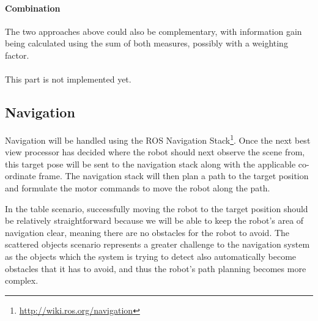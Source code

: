 \documentclass[a4paper,11pt,english]{article}
\begin{document}
\paragraph{Combination}
The two approaches above could also be complementary, with information gain being calculated using the sum of both measures, possibly with a weighting factor.


\paragraph{}
This part is not implemented yet.

\subsection{Navigation}
\label{system:navigation}
Navigation will be handled using the ROS Navigation Stack\footnote{\url{http://wiki.ros.org/navigation}}.
Once the next best view processor has decided where the robot should next observe the scene from, this target pose will be sent to the navigation stack along with the applicable co-ordinate frame.
The navigation stack will then plan a path to the target position and formulate the motor commands to move the robot along the path.

In the table scenario, successfully moving the robot to the target position should be relatively straightforward because we will be able to keep the robot's area of navigation clear, meaning there are no obstacles for the robot to avoid.
The scattered objects scenario represents a greater challenge to the navigation system as the objects which the system is trying to detect also automatically become obstacles that it has to avoid, and thus the robot's path planning becomes more complex.
\end{document}
